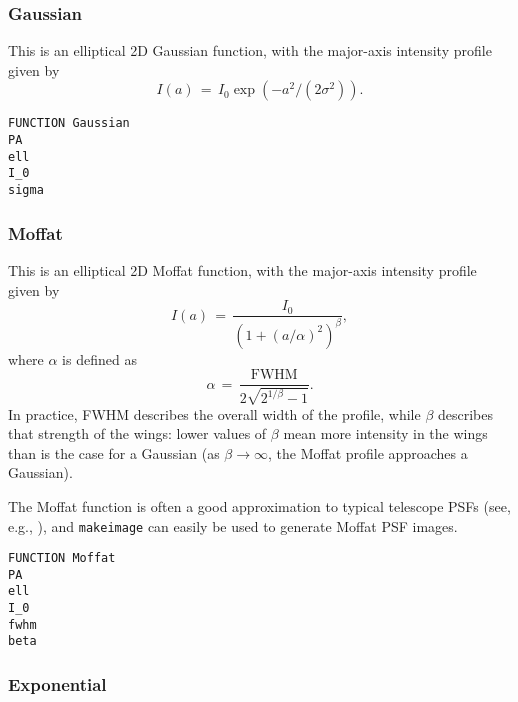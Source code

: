 \documentclass[10pt,a4paper,article]{memoir}
\newcommand{\makeimage}{\texttt{makeimage}}
\begin{document}
\subsubsection{Gaussian}

This is an elliptical 2D Gaussian function, with the major-axis intensity
profile given by
\begin{equation}
I(a) \, = \, I_{0} \exp(-a^2/(2 \sigma^2)).
\end{equation}

\begin{verbatim}
FUNCTION Gaussian
PA
ell
I_0
sigma
\end{verbatim}


\subsubsection{Moffat}

This is an elliptical 2D Moffat function, with the major-axis intensity profile
given by
\begin{equation}
I(a) \, = \, \frac{I_{0}  }{(1 + (a/\alpha)^{2})^{\beta} },
\end{equation}
where $\alpha$ is defined as
\begin{equation}
\alpha \, = \, \frac{ {\mathrm{FWHM}}}{2 \sqrt{2^{1/\beta} - 1}}.
\end{equation}
In practice, FWHM describes the overall width of the profile, while $\beta$ describes that
strength of the wings: lower values of $\beta$ mean more intensity in the wings
than is the case for a Gaussian (as $\beta \rightarrow \infty$, the Moffat profile
approaches a Gaussian).

The Moffat function is often a good approximation to typical telescope PSFs (see, e.g.,
\citealt{trujillo01}), and \makeimage{} can easily be used to generate Moffat PSF images.

\begin{verbatim}
FUNCTION Moffat
PA
ell
I_0
fwhm
beta
\end{verbatim}


%


\subsubsection{Exponential}
\end{document}
